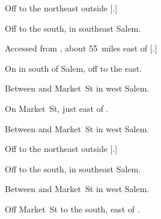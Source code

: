 

\begin{LocationList}

Off   to the northeast outside [.]

Off   to the south, in southeast Salem.

Accessed from , about 55~miles east of [.]

\Location{\GasStation \Gas \Rest}
On  in  south of Salem, off  to the east.

\Location{\GarageHQ \Garage}
Between  and Market~St in west Salem.

On  Market~St, just east of  .

Between  and Market~St in west Salem.

Off   to the northeast outside [.]

Off   to the south, in southeast Salem.

\Location{\RecruitmentAgency \Recruitment}
Between  and Market~St in west Salem.

Off  Market~St to the south, east of  .

\end{LocationList}

